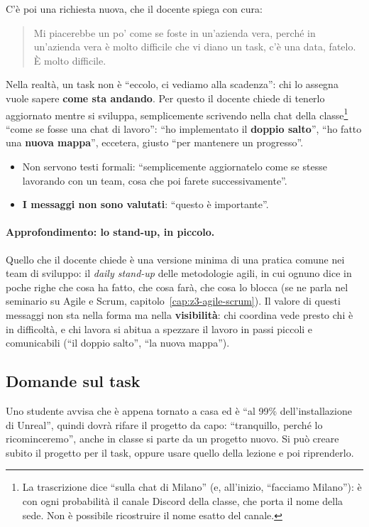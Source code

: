 C'è poi una richiesta nuova, che il docente spiega con cura:
\begin{quote}
Mi piacerebbe un po' come se foste in un'azienda vera, perché in un'azienda vera
è molto difficile che vi diano un task, c'è una data, fatelo. È molto difficile.
\end{quote}
Nella realtà, un task non è ``eccolo, ci vediamo alla scadenza'': chi lo
assegna vuole sapere \textbf{come sta andando}. Per questo il docente chiede di
tenerlo aggiornato mentre si sviluppa, semplicemente scrivendo nella chat della
classe\footnote{La trascrizione dice ``sulla chat di Milano'' (e, all'inizio,
``facciamo Milano''): è con ogni probabilità il canale Discord della classe,
che porta il nome della sede. Non è possibile ricostruire il nome esatto del
canale.} ``come se fosse una chat di lavoro'': ``ho implementato il
\textbf{doppio salto}'', ``ho fatto una \textbf{nuova mappa}'', eccetera, giusto
``per mantenere un progresso''.
\begin{itemize}
  \item Non servono testi formali: ``semplicemente aggiornatelo come se stesse
        lavorando con un team, cosa che poi farete successivamente''.
  \item \textbf{I messaggi non sono valutati}: ``questo è importante''.
\end{itemize}

\paragraph{Approfondimento: lo stand-up, in piccolo.} Quello che il docente
chiede è una versione minima di una pratica comune nei team di sviluppo: il
\emph{daily stand-up} delle metodologie agili, in cui ognuno dice in poche righe
che cosa ha fatto, che cosa farà, che cosa lo blocca (se ne parla nel
seminario su Agile e Scrum, capitolo~\ref{cap:z3-agile-scrum}). Il valore di questi
messaggi non sta nella forma ma nella \textbf{visibilità}: chi coordina vede
presto chi è in difficoltà, e chi lavora si abitua a spezzare il lavoro in
passi piccoli e comunicabili (``il doppio salto'', ``la nuova mappa'').

\subsection{Domande sul task}

Uno studente avvisa che è appena tornato a casa ed è ``al 99\%
dell'installazione di Unreal'', quindi dovrà rifare il progetto da capo:
``tranquillo, perché lo ricominceremo'', anche in classe si parte da un
progetto nuovo. Si può creare subito il progetto per il task, oppure usare
quello della lezione e poi riprenderlo.

